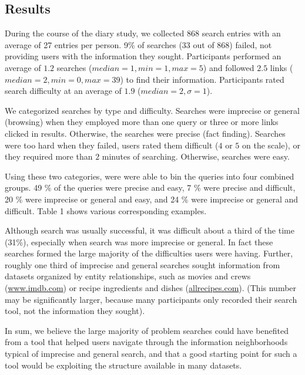 \subsection{Results}

During the course of the diary study, we collected $868$ search entries with an average of 27 entries per person. 9\% of searches (33 out of 868) failed, not providing users with the information they sought. Participants performed an average of $1.2$ searches ($median=1, min =1, max=5$) and followed $2.5$ links ($median=2, min=0, max=39$) to find their information. Participants rated search difficulty at an average of $1.9$ ($median=2,  \sigma=1$). 

We categorized searches by type and difficulty. Searches were imprecise or general (browsing) when they employed more than one query or three or more links clicked in results. Otherwise, the searches were precise (fact finding). Searches were too hard when they failed, users rated them difficult ($4$ or $5$ on the scale), or they required more than $2$ minutes of searching. Otherwise, searches were easy. 

Using these two categories, were were able to bin the queries into four combined groups. 49 \% of the queries were precise and easy, 7 \% were precise and difficult, 20 \% were imprecise or general and easy, and 24 \% were imprecise or general and difficult. Table 1 shows various corresponding examples.

Although search was usually successful, it was difficult about a third of the time (31\%), especially when search was more imprecise or general. In fact these searches formed the large majority of the difficulties users were having. Further, roughly one third of imprecise and general searches sought information from datasets organized by entity relationships, such as movies and crews (\url{www.imdb.com}) or recipe ingredients and dishes (\url{allrecipes.com}). (This number may be significantly larger, because many participants only recorded their search tool, not the information they sought).

In sum, we believe the large majority of problem searches could have benefited from a tool that helped users navigate through the information neighborhoods typical of imprecise and general search, and that a good starting point for such a tool would be exploiting the structure available in many datasets. 

